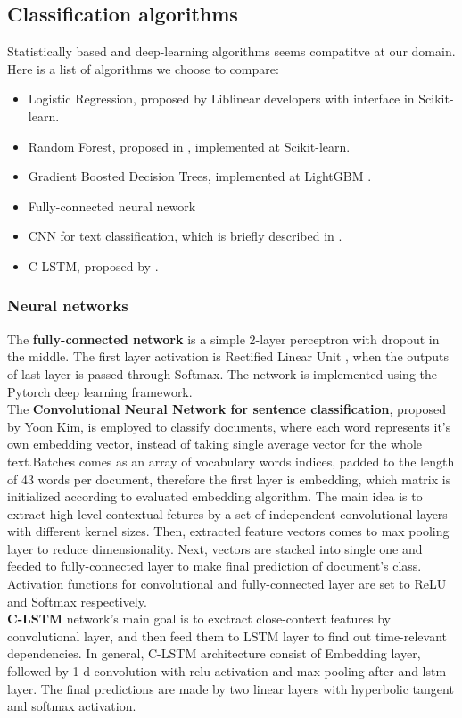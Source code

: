 \documentclass[unicode, 12pt, a4paper,oneside]{article}
\begin{document}
	\subsection{Classification algorithms}
	 Statistically based and deep-learning algorithms seems compatitve at our domain. Here is a list of algorithms we choose to compare:
	\begin{itemize}
	\item Logistic Regression, proposed by Liblinear developers \cite{liblinear} with interface in Scikit-learn.
	\item Random Forest, proposed in \cite{randomforest}, implemented at Scikit-learn.
	\item Gradient Boosted Decision Trees, implemented at LightGBM \cite{lightgbm}.
	\item Fully-connected neural nework
	\item CNN for text classification, which is briefly described in \cite{cnn}.
	\item C-LSTM, proposed by \cite{clstm}.
	\end{itemize}

	\subsubsection{Neural networks}
		The {\bf fully-connected network} is a simple 2-layer perceptron with dropout in the middle. The first layer activation is Rectified Linear Unit \cite{relu}, when the outputs of last layer is passed through Softmax. The network is implemented using the Pytorch\cite{pytorch} deep learning framework.\\
		The {\bf Convolutional Neural Network for sentence classification}, proposed by Yoon Kim, is employed to classify documents, where each word represents it's own embedding vector, instead of taking single average vector for the whole text.Batches comes as an array of vocabulary words indices, padded to the length of 43 words per document, therefore the first layer is embedding, which matrix is initialized according to evaluated embedding algorithm. The main idea is to extract high-level contextual fetures by a set of independent convolutional layers with different kernel sizes. Then, extracted feature vectors comes to max pooling layer to reduce dimensionality. Next, vectors are stacked into single one and feeded to fully-connected layer to make final prediction of document's class. Activation functions for convolutional and fully-connected layer are set to ReLU and Softmax respectively.\\
		{\bf C-LSTM} network's main goal is to exctract close-context features by convolutional layer, and then feed them to LSTM layer to find out time-relevant dependencies. In general, C-LSTM architecture consist of Embedding layer, followed by 1-d convolution with relu activation and max pooling after and lstm layer. The final predictions are made by two linear layers with hyperbolic tangent and softmax activation.
\end{document}

